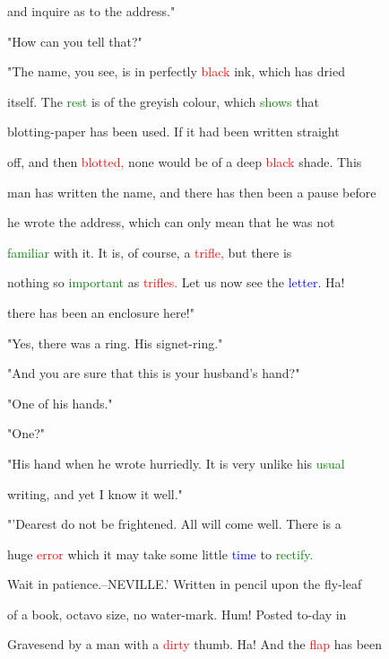  and inquire as to the address."



 "How can you tell that?"



 "The name, you see, is in perfectly \textcolor{red}{black} ink, which has dried

 itself. The \textcolor{green}{rest} is of the greyish colour, which \textcolor{green}{shows} that

 blotting-paper has been used. If it had been written straight

 off, and then \textcolor{red}{blotted,} none would be of a deep \textcolor{red}{black} shade. This

 man has written the name, and there has then been a pause before

 he wrote the address, which can only mean that he was not

 \textcolor{green}{familiar} with it. It is, of course, a \textcolor{red}{trifle,} but there is

 nothing so \textcolor{green}{important} as \textcolor{red}{trifles.} Let us now see the \textcolor{blue}{letter.} Ha!

 there has been an enclosure here!"



 "Yes, there was a ring. His signet-ring."



 "And you are sure that this is your husband's hand?"



 "One of his hands."



 "One?"



 "His hand when he wrote hurriedly. It is very unlike his \textcolor{green}{usual}

 writing, and yet I know it well."



 "'Dearest do not be \textcolor{BurntOrange}{frightened.} All will come well. There is a

 huge \textcolor{red}{error} which it may take some little \textcolor{blue}{time} to \textcolor{green}{rectify.}

 \textcolor{BurntOrange}{Wait} in patience.--NEVILLE.' Written in pencil upon the fly-leaf

 of a book, octavo size, no water-mark. Hum! Posted to-day in

 Gravesend by a man with a \textcolor{red}{dirty} thumb. Ha! And the \textcolor{red}{flap} has been

